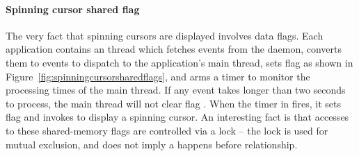 
\paragraph{Spinning cursor shared flag}
The very fact that spinning cursors are displayed involves data
flags. Each application contains an  thread which fetches
 events from the  daemon, converts them
to  events to dispatch to the application's main thread, sets
flag  as shown in
Figure~\ref{fig:spinningcursorsharedflags}, and arms a timer to monitor
the processing times of the main thread.  If any  event takes
longer than two seconds to process, the main thread will not clear flag
.  When the timer in 
fires, it sets flag  and invokes
 to display a spinning cursor.  An interesting fact is
that accesses to these shared-memory flags are controlled via a lock --
the lock is used for mutual exclusion, and does not imply a happens before
relationship.
